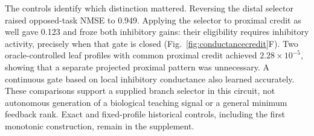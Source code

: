 The controls identify which distinction mattered. Reversing the distal selector raised opposed-task NMSE to 0.949. Applying the selector to proximal credit as well gave 0.123 and froze both inhibitory gains: their eligibility requires inhibitory activity, precisely when that gate is closed (Fig.~\ref{fig:conductancecredit}F). Two oracle-controlled leaf profiles with common proximal credit achieved $2.28\times10^{-5}$, showing that a separate projected proximal pattern was unnecessary. A continuous gate based on local inhibitory conductance also learned accurately. These comparisons support a supplied branch selector in this circuit, not autonomous generation of a biological teaching signal or a general minimum feedback rank. Exact and fixed-profile historical controls, including the first monotonic construction, remain in the supplement.
